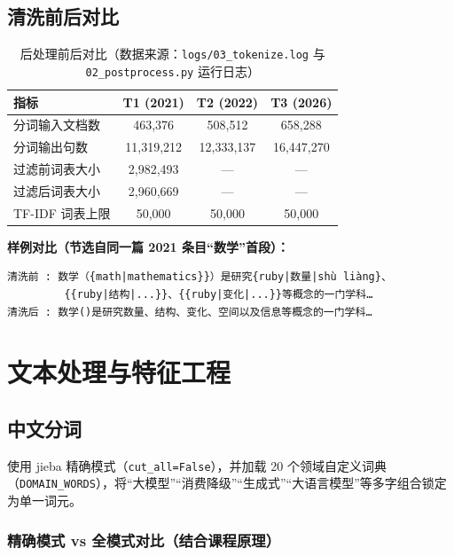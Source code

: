 \documentclass[12pt,a4paper]{article}
\begin{document}
\subsection{清洗前后对比}

\begin{table}[H]
\centering
\caption{后处理前后对比（数据来源：\texttt{logs/03\_tokenize.log} 与 \texttt{02\_postprocess.py} 运行日志）}
\renewcommand{\arraystretch}{1.3}
\begin{tabular}{|l|c|c|c|}
\hline
\textbf{指标} & \textbf{T1 (2021)} & \textbf{T2 (2022)} & \textbf{T3 (2026)} \\
\hline
分词输入文档数 & 463,376 & 508,512 & 658,288 \\
\hline
分词输出句数 & 11,319,212 & 12,333,137 & 16,447,270 \\
\hline
过滤前词表大小 & 2,982,493 & — & — \\
\hline
过滤后词表大小 & 2,960,669 & — & — \\
\hline
TF-IDF 词表上限 & 50,000 & 50,000 & 50,000 \\
\hline
\end{tabular}
\end{table}

\textbf{样例对比（节选自同一篇 2021 条目“数学”首段）：}

\begin{lstlisting}[basicstyle=\ttfamily\scriptsize]
清洗前 : 数学（{math|mathematics}}）是研究{ruby|数量|shù liàng}、
         {{ruby|结构|...}}、{{ruby|变化|...}}等概念的一门学科…
清洗后 : 数学()是研究数量、结构、变化、空间以及信息等概念的一门学科…
\end{lstlisting}

\section{文本处理与特征工程}

\subsection{中文分词}

使用 jieba 精确模式（\texttt{cut\_all=False}），并加载 20 个领域自定义词典（\texttt{DOMAIN\_WORDS}），将“大模型”“消费降级”“生成式”“大语言模型”等多字组合锁定为单一词元。

\subsubsection*{精确模式 vs 全模式对比（结合课程原理）}
\end{document}
